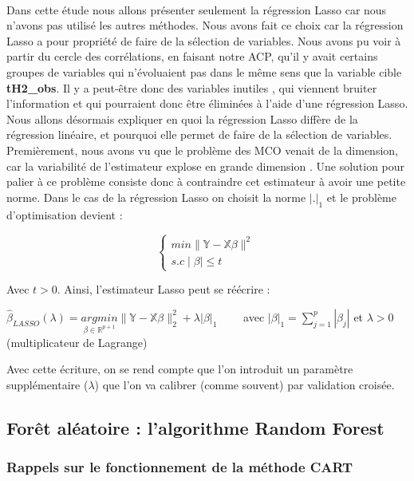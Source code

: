 \documentclass[14pt, openany]{article}
\begin{document}
\paragraph{}
Dans cette étude nous allons présenter seulement la régression Lasso car nous n'avons pas utilisé les autres méthodes. Nous avons fait ce choix car la régression Lasso a pour propriété de faire de la sélection de variables. Nous avons pu voir à partir du cercle des corrélations, en faisant notre ACP, qu'il y avait certains groupes de variables qui n'évoluaient pas dans le même sens que la variable cible \textbf{tH2\_obs}. Il y a peut-être donc des variables \og inutiles \fg{}, qui viennent bruiter l'information et qui pourraient donc être éliminées à l'aide d'une régression Lasso. Nous allons désormais expliquer en quoi la régression Lasso diffère de la régression linéaire, et pourquoi elle permet de faire de la sélection de variables. Premièrement, nous avons vu que le problème des MCO venait de la dimension, car la variabilité de l'estimateur \og explose \fg{} en grande dimension . Une solution pour palier à ce problème consiste donc à contraindre cet estimateur à avoir une \og petite \fg{} norme. Dans le cas de la régression Lasso on choisit la norme $|.|_1$ et le problème d'optimisation devient :
\begin{center}
$$
\left\{
    \begin{array}{ll}
        min \parallel \mathbb{Y} - \mathbb{X}\beta \parallel^2  \\
        s.c  \mid\beta\mid\leq t
    \end{array}
\right.
$$
\end{center}
Avec $t>0$. Ainsi, l'estimateur Lasso peut se réécrire :
\begin{center}
$\hat{\beta}_{LASSO}(\lambda) = \underset{\beta\in\mathbb{R}^{p+1} }{argmin}\parallel \mathbb{Y} - \mathbb{X}\beta \parallel^2_2 + \lambda |\beta|_1 \qquad$ avec $|\beta|_1 = \sum\limits_{j=1}^p|\beta_j|$ et $\lambda > 0$ (multiplicateur de Lagrange)
\end{center}
Avec cette écriture, on se rend compte que l'on introduit un paramètre supplémentaire ($\lambda$) que l'on va calibrer (comme souvent) par validation croisée.
\subsection{Forêt aléatoire : l'algorithme Random Forest}
\subsubsection{Rappels sur le fonctionnement de la méthode CART}
\end{document}
